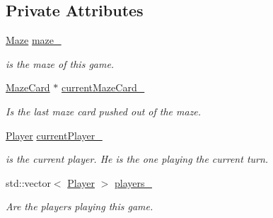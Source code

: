 \subsection*{Private Attributes}
\begin{DoxyCompactItemize}
\item 
\mbox{\label{classlabyrinth_1_1_game_ae527454a855736675a0fda2201a91d13}} 
\mbox{\hyperlink{classlabyrinth_1_1_maze}{Maze}} \mbox{\hyperlink{classlabyrinth_1_1_game_ae527454a855736675a0fda2201a91d13}{maze\+\_\+}}
\begin{DoxyCompactList}\small\item\em is the maze of this game. \end{DoxyCompactList}\item 
\mbox{\label{classlabyrinth_1_1_game_a2e54f1ca26dd55f8863ee2fbf9a7ca50}} 
\mbox{\hyperlink{structlabyrinth_1_1_maze_card}{Maze\+Card}} $\ast$ \mbox{\hyperlink{classlabyrinth_1_1_game_a2e54f1ca26dd55f8863ee2fbf9a7ca50}{current\+Maze\+Card\+\_\+}}
\begin{DoxyCompactList}\small\item\em Is the last maze card pushed out of the maze. \end{DoxyCompactList}\item 
\mbox{\label{classlabyrinth_1_1_game_a4628a0c70b585b85dc26d1db4cb52971}} 
\mbox{\hyperlink{structlabyrinth_1_1_player}{Player}} \mbox{\hyperlink{classlabyrinth_1_1_game_a4628a0c70b585b85dc26d1db4cb52971}{current\+Player\+\_\+}}
\begin{DoxyCompactList}\small\item\em is the current player. He is the one playing the current turn. \end{DoxyCompactList}\item 
\mbox{\label{classlabyrinth_1_1_game_a8f50d70bcff30fed8471eb02aee9aab0}} 
std\+::vector$<$ \mbox{\hyperlink{structlabyrinth_1_1_player}{Player}} $>$ \mbox{\hyperlink{classlabyrinth_1_1_game_a8f50d70bcff30fed8471eb02aee9aab0}{players\+\_\+}}
\begin{DoxyCompactList}\small\item\em Are the players playing this game. \end{DoxyCompactList}\end{DoxyCompactItemize}


